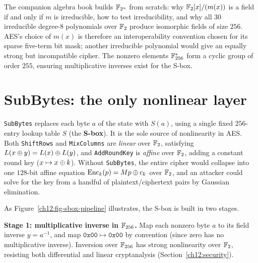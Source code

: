\begin{connectionbox}
The companion algebra book builds $\mathbb{F}_{2^n}$ from scratch: why $\mathbb{F}_2[x]/(m(x))$
is a field if and only if $m$ is irreducible, how to test irreducibility, and why
all $30$ irreducible degree-$8$ polynomials over $\mathbb{F}_2$ produce isomorphic fields
of size $256$. AES's choice of $m(x)$ is therefore an interoperability convention
chosen for its sparse five-term bit mask; another irreducible polynomial would
give an equally strong but incompatible cipher. The nonzero elements $\mathbb{F}_{256}^{*}$
form a cyclic group of order $255$, ensuring multiplicative inverses exist for the
S-box.
\end{connectionbox}

\section{SubBytes: the only nonlinear layer}
\label{ch12:subbytes}

\texttt{SubBytes} replaces each byte $a$ of the state with $S(a)$, using a single
fixed $256$-entry lookup table $S$ (the \textbf{S-box}). It is the sole source of
nonlinearity in AES. Both \texttt{ShiftRows} and \texttt{MixColumns} are
\emph{linear} over $\mathbb{F}_2$, satisfying $L(x \oplus y) = L(x) \oplus L(y)$, and
\texttt{AddRoundKey} is \emph{affine} over $\mathbb{F}_2$, adding a constant round key
($x \mapsto x \oplus k$). Without \texttt{SubBytes}, the entire cipher would collapse
into one $128$-bit affine equation $\operatorname{Enc}_k(p) = Mp \oplus c_k$ over $\mathbb{F}_2$, and an
attacker could solve for the key from a handful of plaintext/ciphertext pairs by
Gaussian elimination.

As Figure~\ref{ch12:fig-sbox-pipeline} illustrates, the S-box is built in two stages.

\textbf{Stage 1: multiplicative inverse in $\mathbb{F}_{256}$.} Map each nonzero byte $a$
to its field inverse $y = a^{-1}$, and map $\mathtt{0x00} \mapsto \mathtt{0x00}$ by
convention (since zero has no multiplicative inverse). Inversion over $\mathbb{F}_{256}$ has
strong nonlinearity over $\mathbb{F}_2$, resisting both differential and linear
cryptanalysis (Section~\ref{ch12:security}).


